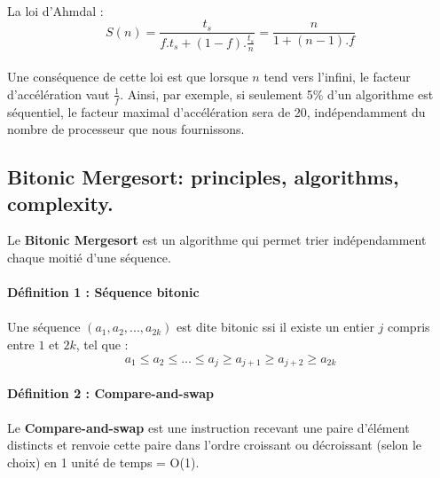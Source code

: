 \paragraph{}
La loi d'Ahmdal  : 
\begin{equation}
S(n) = \frac{t_{s}}{f . t_{s} + (1-f) . \frac{t_{s}}{n}}  = \frac{n}{1+(n-1).f}
\end{equation}
\paragraph{}
Une conséquence de cette loi est que lorsque $n$ tend vers l'infini, le facteur d'accélération vaut $\frac{1}{f}$. Ainsi, par exemple, si seulement 5\% d'un algorithme est séquentiel, le facteur maximal d'accélération sera de 20, indépendamment du nombre de processeur que nous fournissons.

\subsection{Bitonic Mergesort: principles, algorithms, complexity.}
Le \textbf{Bitonic Mergesort} est un algorithme qui permet trier indépendamment chaque moitié d'une séquence.
\paragraph{}
\textbf{Définition 1 : Séquence bitonic}
\paragraph{}
Une séquence $(a_1, a_2, ..., a_{2k})$ est dite bitonic ssi il existe un entier $j$ compris entre $1$ et $2k$, tel que : \[a_1 \leq a_2 \leq ... \leq a_j \geq a_{j+1} \geq a_{j+2} \geq a_{2k} \]

\paragraph{}
\textbf{Définition 2 : Compare-and-swap}
\paragraph{}
Le \textbf{Compare-and-swap} est une instruction recevant une paire d'élément distincts et renvoie cette paire dans l'ordre croissant ou décroissant (selon le choix) en 1 unité de temps = O(1).

